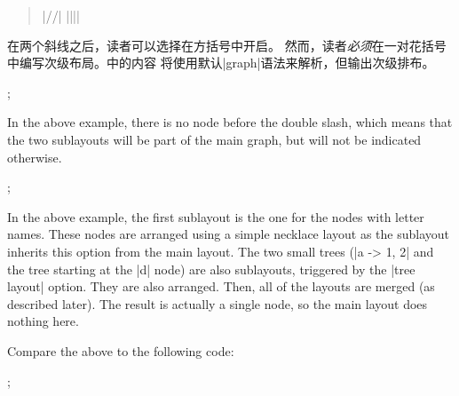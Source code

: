 \begin{quote}
  |//|  |{||}|
\end{quote}

在两个斜线之后，读者可以选择在方括号中开启。
然而，读者\emph{必须}在一对花括号中编写次级布局。中的内容
将使用默认|graph|语法来解析，但输出次级排布。

\begin{codeexample}[]
\tikz {};
\end{codeexample}


In the above example, there is no node before the double slash, which
means that the two sublayouts will be part of the main graph, but will
not be indicated otherwise.

\begin{codeexample}[] 
\tikz {};
\end{codeexample}

In the above example, the first sublayout is the one for the nodes
with letter names. These nodes are arranged using a simple necklace layout
as the sublayout inherits this option from the main layout. The two
small trees (|a -> {1, 2}| and the tree starting at the |d| node)
are also sublayouts, triggered by the |tree layout| option. They are
also arranged. Then, all of the layouts are merged (as described
later). The result is actually a single node, so the main layout
does nothing here.

Compare the above to the following code:
  
\begin{codeexample}[] 
\tikz {};
\end{codeexample}  

